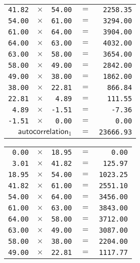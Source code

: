{\begin{multicols}{2}
\begin{tabular}{rrrrr}
  \texttt{41.82} & $\times$ & \texttt{54.00} & $=$ & \texttt{2258.35} \\
  \texttt{54.00} & $\times$ & \texttt{61.00} & $=$ & \texttt{3294.00} \\
  \texttt{61.00} & $\times$ & \texttt{64.00} & $=$ & \texttt{3904.00} \\
  \texttt{64.00} & $\times$ & \texttt{63.00} & $=$ & \texttt{4032.00} \\
  \texttt{63.00} & $\times$ & \texttt{58.00} & $=$ & \texttt{3654.00} \\
  \texttt{58.00} & $\times$ & \texttt{49.00} & $=$ & \texttt{2842.00} \\
  \texttt{49.00} & $\times$ & \texttt{38.00} & $=$ & \texttt{1862.00} \\
  \texttt{38.00} & $\times$ & \texttt{22.81} & $=$ & \texttt{866.84} \\
  \texttt{22.81} & $\times$ & \texttt{4.89} & $=$ & \texttt{111.55} \\
  \texttt{4.89} & $\times$ & \texttt{-1.51} & $=$ & \texttt{-7.36} \\
  \texttt{-1.51} & $\times$ & \texttt{0.00} & $=$ & \texttt{0.00} \\
  \hline
  \multicolumn{3}{r}{$\textsf{autocorrelation}_1$} & $=$ & \texttt{23666.93} \\
\end{tabular}
\par
\begin{tabular}{rrrrr}
  \texttt{0.00} & $\times$ & \texttt{18.95} & $=$ & \texttt{0.00} \\
  \texttt{3.01} & $\times$ & \texttt{41.82} & $=$ & \texttt{125.97} \\
  \texttt{18.95} & $\times$ & \texttt{54.00} & $=$ & \texttt{1023.25} \\
  \texttt{41.82} & $\times$ & \texttt{61.00} & $=$ & \texttt{2551.10} \\
  \texttt{54.00} & $\times$ & \texttt{64.00} & $=$ & \texttt{3456.00} \\
  \texttt{61.00} & $\times$ & \texttt{63.00} & $=$ & \texttt{3843.00} \\
  \texttt{64.00} & $\times$ & \texttt{58.00} & $=$ & \texttt{3712.00} \\
  \texttt{63.00} & $\times$ & \texttt{49.00} & $=$ & \texttt{3087.00} \\
  \texttt{58.00} & $\times$ & \texttt{38.00} & $=$ & \texttt{2204.00} \\
  \texttt{49.00} & $\times$ & \texttt{22.81} & $=$ & \texttt{1117.77} \\

\end{tabular}
\end{multicols}}
